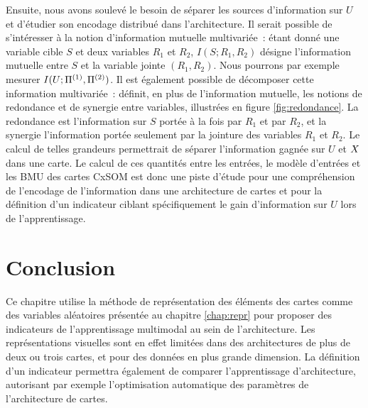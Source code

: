 \documentclass[../main]{subfiles}
\begin{document}
Ensuite, nous avons soulevé le besoin de séparer les sources d'information sur $U$ et d'étudier son encodage distribué dans l'architecture. Il serait possible de s'intéresser à la notion d'information mutuelle multivariée~: étant donné une variable cible $S$ et deux variables $R_1$ et $R_2$, $I(S;R_1,R_2)$ désigne l'information mutuelle entre $S$ et la variable jointe $(R_1,R_2)$. 
Nous pourrons par exemple mesurer $I(U; \Pi^{({1})}, \Pi^{({2})})$.
Il est également possible de décomposer cette information multivariée~: \cite{williams_nonnegative_2010} définit, en plus de l'information mutuelle, les notions de redondance et de synergie entre variables, illustrées en figure \ref{fig:redondance}.
La redondance est l'information sur $S$ portée à la fois par $R_1$ et par $R_2$, et la synergie l'information portée seulement par la jointure des variables $R_1$ et $R_2$. Le calcul de telles grandeurs permettrait de séparer l'information gagnée sur $U$ et $X$ dans une carte.
Le calcul de ces quantités entre les entrées, le modèle d'entrées et les BMU des cartes CxSOM est donc une piste d'étude pour une compréhension de l'encodage de l'information dans une architecture de cartes et pour la définition d'un indicateur ciblant spécifiquement le gain d'information sur $U$ lors de l'apprentissage.


\section{Conclusion}

Ce chapitre utilise la méthode de représentation des éléments des cartes comme des variables aléatoires présentée au chapitre \ref{chap:repr} pour proposer des indicateurs de l'apprentissage multimodal au sein de l'architecture.
Les représentations visuelles sont en effet limitées dans des architectures de plus de deux ou trois cartes, et pour des données en plus grande dimension. La définition d'un indicateur permettra également de comparer l'apprentissage d'architecture, autorisant par exemple l'optimisation automatique des paramètres de l'architecture de cartes.
\end{document}
